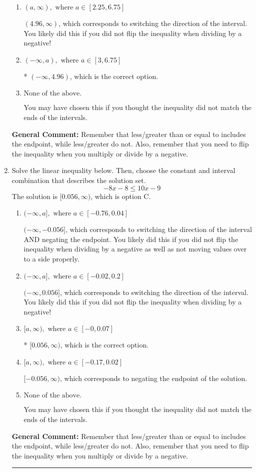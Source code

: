 \documentclass{extbook}[14pt]
\newcommand{\litem}[1]{\item #1

\rule{\textwidth}{0.4pt}}
\begin{document}
\begin{enumerate}
{\begin{enumerate}[label=\Alph*.]
 $(-\infty, -4.96)$, which corresponds to negating the endpoint of the solution.
\item \( (a, \infty), \text{ where } a \in [2.25, 6.75] \)

 $(4.96, \infty)$, which corresponds to switching the direction of the interval. You likely did this if you did not flip the inequality when dividing by a negative!
\item \( (-\infty, a), \text{ where } a \in [3, 6.75] \)

* $(-\infty, 4.96)$, which is the correct option.
\item \( \text{None of the above}. \)

You may have chosen this if you thought the inequality did not match the ends of the intervals.
\end{enumerate}

\textbf{General Comment:} Remember that less/greater than or equal to includes the endpoint, while less/greater do not. Also, remember that you need to flip the inequality when you multiply or divide by a negative.
}
\litem{
Solve the linear inequality below. Then, choose the constant and interval combination that describes the solution set.
\[ -8x -8 \leq 10x -9 \]The solution is \( [0.056, \infty) \), which is option C.\begin{enumerate}[label=\Alph*.]
\item \( (-\infty, a], \text{ where } a \in [-0.76, 0.04] \)

 $(-\infty, -0.056]$, which corresponds to switching the direction of the interval AND negating the endpoint. You likely did this if you did not flip the inequality when dividing by a negative as well as not moving values over to a side properly.
\item \( (-\infty, a], \text{ where } a \in [-0.02, 0.2] \)

 $(-\infty, 0.056]$, which corresponds to switching the direction of the interval. You likely did this if you did not flip the inequality when dividing by a negative!
\item \( [a, \infty), \text{ where } a \in [-0, 0.07] \)

* $[0.056, \infty)$, which is the correct option.
\item \( [a, \infty), \text{ where } a \in [-0.17, 0.02] \)

 $[-0.056, \infty)$, which corresponds to negating the endpoint of the solution.
\item \( \text{None of the above}. \)

You may have chosen this if you thought the inequality did not match the ends of the intervals.
\end{enumerate}

\textbf{General Comment:} Remember that less/greater than or equal to includes the endpoint, while less/greater do not. Also, remember that you need to flip the inequality when you multiply or divide by a negative.
}
\end{enumerate}
\end{document}
